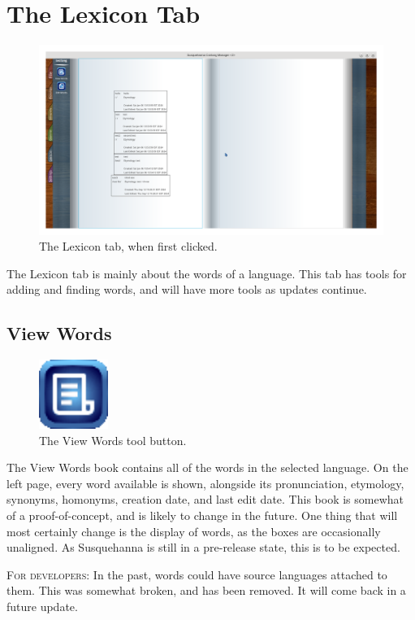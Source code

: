 \documentclass{report}
\begin{document}
	\chapter{The Lexicon Tab}
	\begin{figure}[ht]
		\centering
		\includegraphics[width=1\linewidth]{img/lexicon-tab}
		\caption{The Lexicon tab, when first clicked.}
		\label{fig:lexicon-tab}
	\end{figure}
	The Lexicon tab is mainly about the words of a language. This tab has tools for adding and finding words, and will have more tools as updates continue.
	\newpage 
	\section{View Words}
	\begin{figure}
		\centering
		\includegraphics[width=0.2\textwidth]{img/view-words}
		\caption{The View Words tool button.}
		\label{fig:view-words}
	\end{figure}
	The View Words book contains all of the words in the selected language. On the left page, every word available is shown, alongside its pronunciation, etymology, synonyms, homonyms, creation date, and last edit date. This book is somewhat of a proof-of-concept, and is likely to change in the future. One thing that will most certainly change is the display of words, as the boxes are occasionally unaligned. As Susquehanna is still in a pre-release state, this is to be expected.
	\begin{tcolorbox}[width=1\textwidth]
		\textsc{For developers:} In the past, words could have source languages attached to them. This was somewhat broken, and has been removed. It will come back in a future update.
	\end{tcolorbox}
\end{document}
